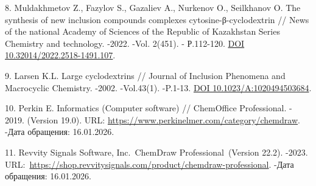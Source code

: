 \begin{refs}
8. Muldakhmetov Z., Fazylov S., Gazaliev A., Nurkenov O., Seilkhanov O.
The synthesis of new inclusion compounds complexes
cytosine-β-cyclodextrin // News of the national Academy of Sciences of
the Republic of Kazakhstan Series Chemistry and technology. -2022. -Vol.
2(451). - Р.112-120.
\href{https://doi.org/10.32014/2022.2518-1491.107}{DOI
10.32014/2022.2518-1491.107}.

9. Larsen K.L. Large cyclodextrins // Journal of Inclusion Phenomena and
Macrocyclic Chemistry. -2002. -Vol.43(1). -P.1-13.
\href{https://doi.org/10.1023/A:1020494503684}{DOI
10.1023/A:1020494503684}.

10. Perkin E. Informatics (Computer software) // ChemOffice
Professional. - 2019. (Version 19.0). URL:
\url{https://www.perkinelmer.com/category/chemdraw}. -Дата обращения:
16.01.2026.

11. Revvity Signals Software, Inc.~ChemDraw Professional~(Version 22.2).
-2023.
URL:~\url{https://shop.revvitysignals.com/product/chemdraw-professional}.
-Дата обращения: 16.01.2026.
\end{refs}

